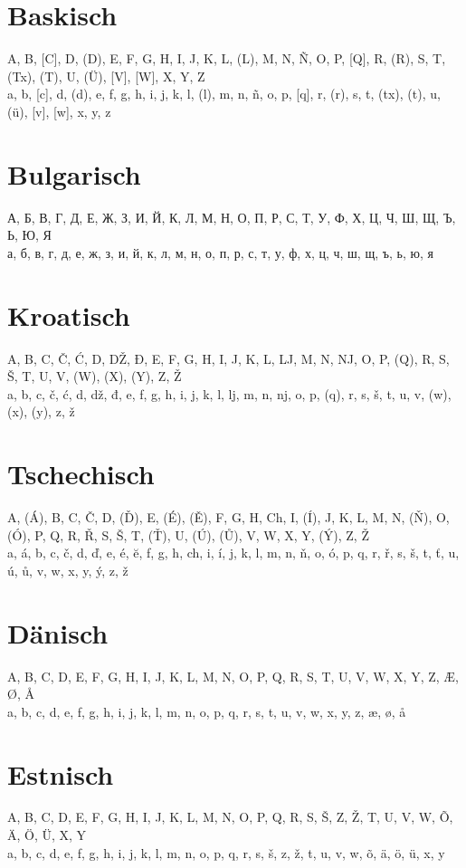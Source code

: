 \documentclass{scrartcl}
\begin{document}
\section{Baskisch}
A, B, [C], D, (D), E, F, G, H, I, J, K, L, (L), M, N, Ñ, O, P, [Q], R, (R), S, T, (Tx), (T), U, (Ü), [V], [W], X, Y, Z \\
a, b, [c], d, (d), e, f, g, h, i, j, k, l, (l), m, n, ñ, o, p, [q], r, (r), s, t, (tx), (t), u, (ü), [v], [w], x, y, z

\section{Bulgarisch}
А, Б, В, Г, Д, Е, Ж, З, И, Й, К, Л, М, Н, О, П, Р, С, Т, У, Ф, Х, Ц, Ч, Ш, Щ, Ъ, Ь, Ю, Я \\
а, б, в, г, д, е, ж, з, и, й, к, л, м, н, о, п, р, с, т, у, ф, х, ц, ч, ш, щ, ъ, ь, ю, я

\section{Kroatisch}
A, B, C, Č, Ć, D, DŽ, Đ, E, F, G, H, I, J, K, L, LJ, M, N, NJ, O, P, (Q), R, S, Š, T, U, V, (W),  (X), (Y), Z, Ž \\
a, b, c, č, ć, d, dž, đ, e, f, g, h, i, j, k, l, lj, m, n, nj, o, p, (q), r, s, š, t, u, v, (w), (x), (y), z, ž

\section{Tschechisch}
A, (Á), B, C, Č, D, (Ď), E, (É), (Ě), F, G, H, Ch, I, (Í), J, K, L, M, N, (Ň), O, (Ó), P, Q, R, Ř, S, Š, T, (Ť), U, (Ú), (Ů), V, W, X, Y, (Ý), Z, Ž \\
a, á, b, c, č, d, ď, e, é, ĕ, f, g, h, ch, i, í, j, k, l, m, n, ň, o, ó, p, q, r, ř, s, š, t, ť, u, ú, ů, v, w, x, y, ý, z, ž

\section{Dänisch}
A, B, C, D, E, F, G, H, I, J, K, L, M, N, O, P, Q, R, S, T, U, V, W, X, Y, Z, Æ, Ø, Å \\
a, b, c, d, e, f, g, h, i, j, k, l, m, n, o, p, q, r, s, t, u, v, w, x, y, z, æ, ø, å

\section{Estnisch}
A, B, C, D, E, F, G, H, I, J, K, L, M, N, O, P, Q, R, S, Š, Z, Ž, T, U, V, W, Õ, Ä, Ö, Ü, X, Y \\
a, b, c, d, e, f, g, h, i, j, k, l, m, n, o, p, q, r, s, š, z, ž, t, u, v, w, õ, ä, ö, ü, x, y
\end{document}
